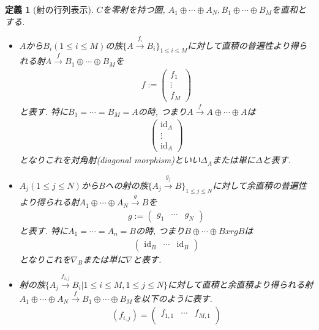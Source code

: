 \documentclass[a4paper,12pt]{ltjsarticle}
\theoremstyle{break}
\newtheorem{defn}[thm]{定義}
\newcommand{\xr}[1]{\xrightarrow{#1}}
\newcommand{\id}{\mathrm{id}}
\newcommand{\opl}{\oplus}
\numberwithin{equation}{section}
\begin{document}
\begin{defn}[射の行列表示]
  $C$を零射を持つ圏, $A_1 \opl \cdots \opl A_N, B_1 \opl \cdots \opl B_M$を直和とする. 
  \begin{itemize}
    \item $A$から$B_i(1 \leq i \leq M)$の族$\{ A \xr{f_i} B_i \}_{1 \leq i \leq M}$に対して直積の普遍性より得られる射$A \xr{f} B_1 \opl \cdots \opl B_M$を
    \begin{align*}
      f :=
      \begin{pmatrix}
        f_1 \\
        \vdots \\
        f_M
      \end{pmatrix}
    \end{align*}
    と表す. 
    特に$B_1= \cdots = B_M=A$の時, つまり$A \xr{f} A \opl \cdots \opl A$は
    \begin{align*}
      \begin{pmatrix}
        \id_A \\
        \vdots \\
        \id_A
      \end{pmatrix}
    \end{align*}
    となりこれを対角射(diagonal morphism)といい$\Delta_A$または単に$\Delta$と表す. 
    \item $A_j(1 \leq j \leq N)$から$B$への射の族$\{ A_j \xr{g_j} B \}_{1 \leq j \leq N}$に対して余直積の普遍性より得られる射$A_1 \opl \cdots \opl A_N \xr{g} B$を
    \begin{align*}
      g :=
      \begin{pmatrix}
        g_1 & \cdots & g_N
      \end{pmatrix}
    \end{align*}
    と表す. 
    特に$A_1= \cdots =A_n=B$の時, つまり$B \opl \cdots \opl B xr{g} B$は
    \begin{align*}
      \begin{pmatrix}
        \id_B & \cdots & \id_B
      \end{pmatrix} 
    \end{align*}
    となりこれを$\nabla_B$または単に$\nabla$と表す. 
    \item 射の族$\{ A_j \xr{f_{i,j}} B_i | 1 \leq i \leq M, 1 \leq j \leq N\}$に対して直積と余直積より得られる射$A_1 \opl \cdots \opl A_N \xr{f} B_1 \opl \cdots \opl B_M$を以下のように表す. 
    \begin{align*}
      (f_{i,j})= 
      \begin{pmatrix}
        f_{1,1} & \cdots & f_{M,1} \\

\end{pmatrix}
\end{align*}
\end{itemize}
\end{defn}
\end{document}
